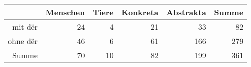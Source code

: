 \begin{tabular}{rrrrrr}
  \hline
 & Menschen & Tiere & Konkreta & Abstrakta & Summe \\ 
  \hline
mit dër & 24 & 4 & 21 & 33 & 82 \\ 
  ohne dër & 46 & 6 & 61 & 166 & 279 \\ 
  Summe & 70 & 10 & 82 & 199 & 361 \\ 
   \hline
\end{tabular}

